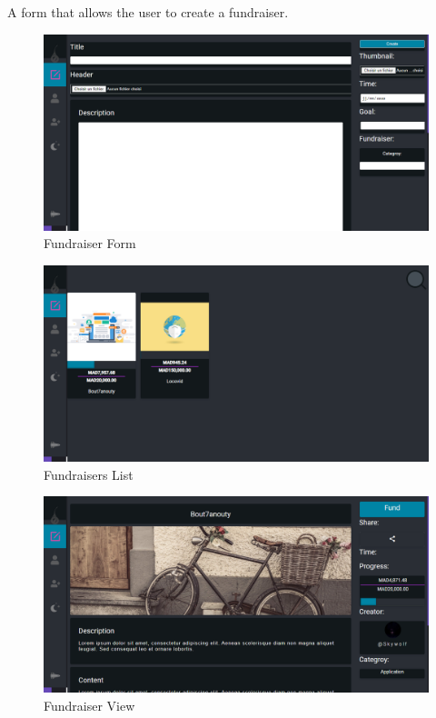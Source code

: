 
A form that allows the user to create a fundraiser.

\begin{figure}[H]
      \centering
      \includegraphics[scale=0.45]{assets/screen-fundraiser-creator.png}
      \caption{Fundraiser Form}
      \label{fig:fundraiser form}
\end{figure}




\begin{figure}[H]
      \centering
      \includegraphics[scale=0.45]{assets/screen-fundraisers-list.png}
      \caption{Fundraisers List}
      \label{fig:fundraisers list}
\end{figure}





\begin{figure}[H]
      \centering
      \includegraphics[scale=0.45]{assets/screen-fundraiser-view.png}
      \caption{Fundraiser View}
      \label{fig:fundraiser view}
\end{figure}




